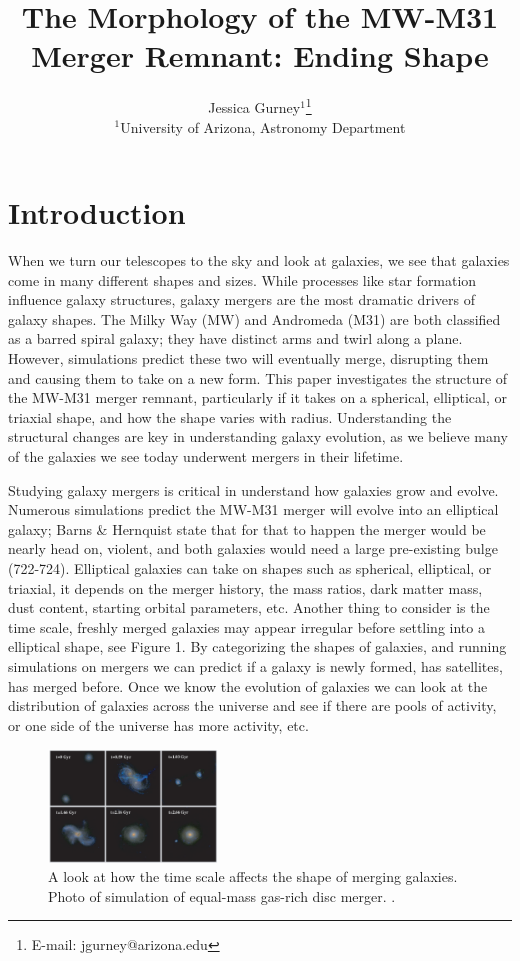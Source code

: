 \documentclass[usenatbib]{mnras}
\title[Shape of Merger Remnant]{The Morphology of the MW-M31 Merger Remnant: Ending Shape}
\author[Jessica Gurney]{
Jessica Gurney$^{1}$\thanks{E-mail: jgurney@arizona.edu}
\\
$^{1}$University of Arizona, Astronomy Department\\
}
\begin{document}
\maketitle


\section{Introduction}
When we turn our telescopes to the sky and look at galaxies, we see that galaxies come in many different shapes and sizes. While processes like star formation influence galaxy structures, galaxy mergers are the most dramatic drivers of galaxy shapes. The Milky Way (MW) and Andromeda (M31) are both classified as a barred spiral galaxy; they have distinct arms and twirl along a plane. However, simulations predict these two will eventually merge, disrupting them and causing them to take on a new form. This paper investigates the structure of the MW-M31 merger remnant, particularly if it takes on a spherical, elliptical, or triaxial shape, and how the shape varies with radius. Understanding the structural changes are key in understanding galaxy evolution, as we believe many of the galaxies we see today underwent mergers in their lifetime.  

Studying galaxy mergers is critical in understand how galaxies grow and evolve. Numerous simulations predict the MW-M31 merger will evolve into an elliptical galaxy; Barns \& Hernquist state that for that to happen the merger would be nearly head on, violent, and both galaxies would need a large pre-existing bulge (722-724). Elliptical galaxies can take on shapes such as spherical, elliptical, or triaxial, it depends on the merger history, the mass ratios, dark matter mass, dust content, starting orbital parameters, etc. Another thing to consider is the time scale, freshly merged galaxies may appear irregular before settling into a elliptical shape, see Figure 1. By categorizing the shapes of galaxies, and running simulations on mergers we can predict if a galaxy is newly formed, has satellites, has merged before. Once we know the evolution of galaxies we can look at the distribution of galaxies across the universe and see if there are pools of activity, or one side of the universe has more activity, etc. 

\begin{figure}[h]
    \centering
    \includegraphics[width=0.4\textwidth]{Galaxy_Merger_J.M.Lotz.png}
    \caption{A look at how the time scale affects the shape of merging galaxies. Photo of simulation of equal-mass gas-rich disc merger. \citet{hopkins08}.}
    \label{fig:morphology}
\end{figure}
\end{document}
